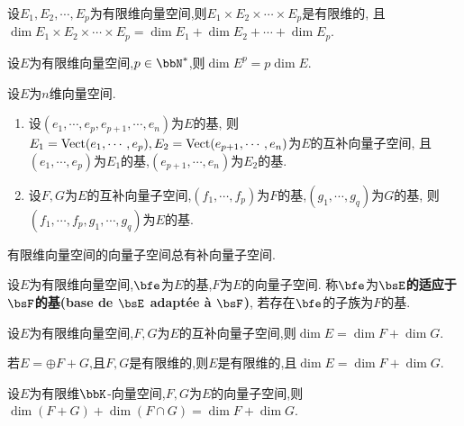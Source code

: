 \begin{prop}
    设$E_1, E_2, \cdots, E_p$为有限维向量空间,则$E_1 \times E_2 \times \cdots \times E_p$是有限维的,
    且$\dim E_1 \times E_2 \times \cdots \times E_p = \dim E_1 + \dim E_2 + \cdots + \dim E_p$.
\end{prop}

\begin{cor}
    设$E$为有限维向量空间,$p \in \bbN^*$,则$\dim E^p = p \dim E$.
\end{cor}

\begin{prop}
    设$E$为$n$维向量空间.

    \begin{enumerate}
        \item 设$(e_1, \cdots, e_p, e_{p + 1}, \cdots, e_n)$为$E$的基,
            则$E_1 = \operatorname{Vect}(e_1, \cdots, e_p), E_2 = \operatorname{Vect}(e_{p + 1}, \cdots, e_n)$为$E$的互补向量子空间,
            且$(e_1, \cdots, e_p)$为$E_1$的基,$(e_{p + 1}, \cdots, e_n)$为$E_2$的基.
        \item 设$F, G$为$E$的互补向量子空间,$(f_1, \cdots, f_p)$为$F$的基,$(g_1, \cdots, g_q)$为$G$的基,
            则$(f_1, \cdots, f_p, g_1, \cdots, g_q)$为$E$的基.
    \end{enumerate}
\end{prop}

\begin{prop}
    有限维向量空间的向量子空间总有补向量子空间.
\end{prop}

\begin{deff}
    设$E$为有限维向量空间,$\bfe$为$E$的基,$F$为$E$的向量子空间.
    称$\bfe$为\textbf{$\bsE$的适应于$\bsF$的基(base de $\bsE$ adaptée à $\bsF$)},
    若存在$\bfe$的子族为$F$的基.
\end{deff}

\begin{prop}
    设$E$为有限维向量空间,$F, G$为$E$的互补向量子空间,则$\dim E = \dim F + \dim G$.
\end{prop}

\begin{rqq}
    若$E = \oplus F + G$,且$F, G$是有限维的,则$E$是有限维的,且$\dim E = \dim F + \dim G$.
\end{rqq}

\begin{prop}
    设$E$为有限维$\bbK$-向量空间,$F, G$为$E$的向量子空间,则$\dim (F + G) + \dim (F \cap G) = \dim F + \dim G$.
\end{prop}

